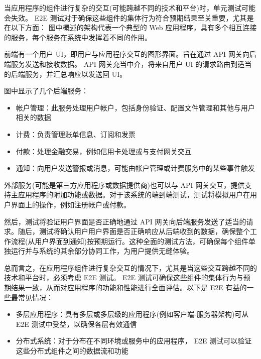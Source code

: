 

当应用程序的组件进行复杂的交互(可能跨越不同的技术和平台)时，单元测试可能会失效。 E2E 测试对于确保这些组件的集体行为符合预期结果至关重要，尤其是在以下方面： 图中概述的架构代表一个典型的 Web 应用程序，具有多个相互连接的服务，每个服务在系统中发挥着不同的作用。


前端有一个用户 UI，即用户与应用程序交互的图形界面。旨在通过 API 网关向后端服务发送和接收数据。 API 网关充当中介，将来自用户 UI 的请求路由到适当的后端服务，并汇总响应以发送回 UI。

图中显示了几个后端服务：

\begin{itemize}
\item
帐户管理：此服务处理用户帐户，包括身份验证、配置文件管理和其他与用户相关的数据

\item
计费：负责管理账单信息、订阅和发票

\item
付款：处理金融交易，例如信用卡处理或与支付网关交互

\item
通知：向用户发送警报或消息，可能由帐户管理或计费服务中的某些事件触发
\end{itemize}

外部服务(可能是第三方应用程序或数据提供商)也可以与 API 网关交互，提供支持主应用程序的附加功能或数据。对于该系统的端到端测试，测试将模拟用户在用户界面上的操作，例如注册帐户或付款。

然后，测试将验证用户界面是否正确地通过 API 网关向后端服务发送了适当的请求。随后，测试将确认用户用户界面是否正确响应从后端收到的数据，确保整个工作流程(从用户界面到通知)按预期运行。这种全面的测试方法，可确保每个组件单独运行并与系统的其余部分协同工作，为用户提供无缝体验。

总而言之，在应用程序组件进行复杂交互的情况下，尤其是当这些交互跨越不同的技术和平台时，必须考虑 E2E 测试。 E2E 测试可确保这些组件的集体行为与预期结果一致，从而对应用程序的功能和性能进行全面评估。以下是 E2E 有益的一些最常见情况：

\begin{itemize}
\item
多层应用程序：具有多层或多层级的应用程序(例如客户端-服务器架构)可从 E2E 测试中受益，以确保各层有效通信

\item
分布式系统：对于分布在不同环境或服务中的应用程序， E2E 测试可以验证这些分布式组件之间的数据流和功能
\end{itemize}

